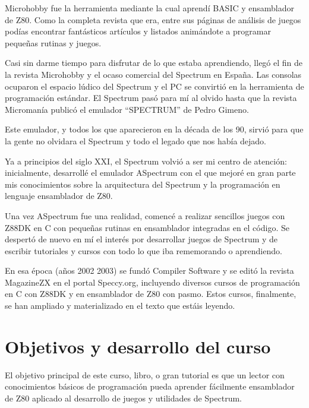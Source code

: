 \documentclass[letterpaper,10pt,spanish]{sphinxmanual}
\begin{document}
Microhobby fue la herramienta mediante la cual aprendí BASIC y ensamblador de Z80. Como la completa revista que era, entre sus páginas de análisis de juegos podías encontrar fantásticos artículos y listados animándote a programar pequeñas rutinas y juegos.

Casi sin darme tiempo para disfrutar de lo que estaba aprendiendo, llegó el fin de la revista Microhobby y el ocaso comercial del Spectrum en España. Las consolas ocuparon el espacio lúdico del Spectrum y el PC se convirtió en la herramienta de programación estándar. El Spectrum pasó para mí al olvido hasta que la revista Micromanía publicó el emulador “SPECTRUM” de Pedro Gimeno.

Este emulador, y todos los que aparecieron en la década de los 90, sirvió para que la gente no olvidara el Spectrum y todo el legado que nos había dejado.

Ya a principios del siglo XXI, el Spectrum volvió a ser mi centro de atención: inicialmente, desarrollé el emulador ASpectrum con el que mejoré en gran parte mis conocimientos sobre la arquitectura del Spectrum y la programación en lenguaje ensamblador de Z80.

Una vez ASpectrum fue una realidad, comencé a realizar sencillos juegos con Z88DK en C con pequeñas rutinas en ensamblador integradas en el código. Se despertó de nuevo en mí el interés por desarrollar juegos de Spectrum y de escribir tutoriales y cursos con todo lo que iba rememorando o aprendiendo.

En esa época (años 2002 \sphinxhyphen{} 2003) se fundó Compiler Software y se editó la revista MagazineZX en el portal Speccy.org, incluyendo diversos cursos de programación en C con Z88DK y en ensamblador de Z80 con pasmo. Estos cursos, finalmente, se han ampliado y materializado en el texto que estáis leyendo.


\section{Objetivos y desarrollo del curso}
\label{\detokenize{01_prologo/prologo:objetivos-y-desarrollo-del-curso}}
El objetivo principal de este curso, libro, o gran tutorial es que un lector con conocimientos básicos de programación pueda aprender fácilmente ensamblador de Z80 aplicado al desarrollo de juegos y utilidades de Spectrum.
\end{document}
